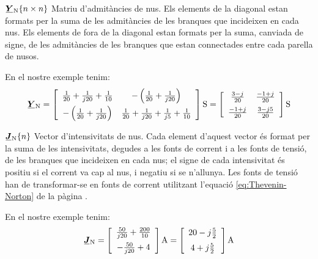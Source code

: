 \begin{list}{}
   {\setlength{\labelwidth}{20mm} \setlength{\leftmargin}{22mm} \setlength{\labelsep}{2mm}}

   \item[$\mcmplx{Y}\ped{N}\{n \times n\}$] Matriu d'admitàncies de nus. Els elements de la diagonal estan formats per la suma de les admitàncies de les branques que incideixen en cada nus.
   Els elements de fora de la diagonal estan formats per la suma, canviada de signe, de les admitàncies de les branques que estan connectades entre cada parella de nusos.

   En el nostre exemple tenim:
   \[
      \mcmplx{Y}\ped{N} =
      \begin{bmatrix}\begin{array}{cc}
            \frac{1}{20} + \frac{1}{j 20} +  \frac{1}{10} &
            -\left(\frac{1}{20} + \frac{1}{j 20}\right) \\[2mm]
            -\left(\frac{1}{20} + \frac{1}{j 20}\right)  &
            \frac{1}{20} + \frac{1}{j 20} +  \frac{1}{j 5} + \frac{1}{10}
      \end{array}\end{bmatrix}\unit{S} =
      \begin{bmatrix}\begin{array}{cc}
            \frac{3 - j}{20}  & \frac{-1 + j}{20} \\[2mm]
            \frac{-1 + j}{20} & \frac{3 - j 5}{20}
      \end{array}\end{bmatrix}\unit{S}
   \]

   \item[$\mcmplx{J}\ped{N}\{n\}$] Vector
d'intensivitats de nus. Cada element d'aquest vector és format per la suma de
les intensivitats, degudes a les fonts de corrent i a les fonts de tensió, de les
branques que incideixen en cada nus; el signe de cada intensivitat és positiu si el
corrent va cap al nus, i negatiu si se n'allunya. Les fonts de tensió han de
transformar-se en fonts de corrent utilitzant l'equació \eqref{eq:Thevenin-Norton} de
la pàgina \pageref{eq:Thevenin-Norton}.

   En el nostre exemple tenim:
   \[
      \mcmplx{J}\ped{N} =
      \begin{bmatrix}\begin{array}{c}
            \frac{50}{j 20} +  \frac{200}{10} \\[2mm]
            - \frac{50}{j 20} + 4
      \end{array}\end{bmatrix}\unit{A} =
      \begin{bmatrix}\begin{array}{c}
            20 - j \frac{5}{2} \\[2mm]
            4 + j \frac{5}{2}
      \end{array}\end{bmatrix}\unit{A}
   \]

\end{list}

